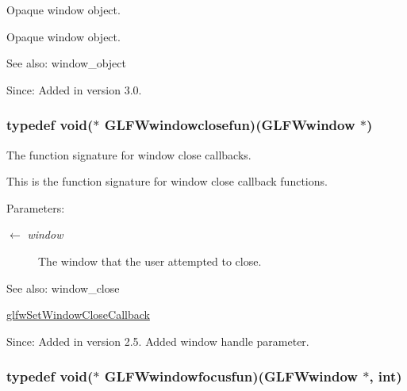 Opaque window object. 

Opaque window object.

\begin{Desc}
\item[See also:]window\_\-object\end{Desc}
\begin{Desc}
\item[Since:]Added in version 3.0. \end{Desc}
\hypertarget{group__window_g07cff8bd3b3d573ecf49bb02d7669c1f}{
\subsubsection[GLFWwindowclosefun]{\setlength{\rightskip}{0pt plus 5cm}typedef void($\ast$  {\bf GLFWwindowclosefun})({\bf GLFWwindow} $\ast$)}}
\label{group__window_g07cff8bd3b3d573ecf49bb02d7669c1f}


The function signature for window close callbacks. 

This is the function signature for window close callback functions.

\begin{Desc}
\item[Parameters:]
\begin{description}
\item[\mbox{$\leftarrow$} {\em window}]The window that the user attempted to close.\end{description}
\end{Desc}
\begin{Desc}
\item[See also:]window\_\-close 

\hyperlink{group__window_g5b827da350141c789acd64f5c4f7a0e1}{glfwSetWindowCloseCallback}\end{Desc}
\begin{Desc}
\item[Since:]Added in version 2.5.  Added window handle parameter. \end{Desc}
\hypertarget{group__window_g6b5f973531ea91663ad707ba4f2ac104}{
\subsubsection[GLFWwindowfocusfun]{\setlength{\rightskip}{0pt plus 5cm}typedef void($\ast$  {\bf GLFWwindowfocusfun})({\bf GLFWwindow} $\ast$, int)}}
\label{group__window_g6b5f973531ea91663ad707ba4f2ac104}


